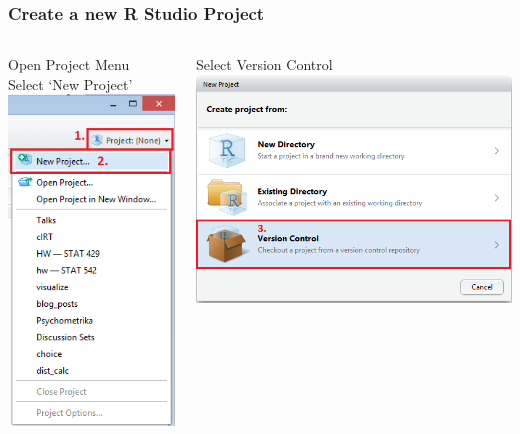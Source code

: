 \documentclass{beamer}\usepackage[]{graphicx}\usepackage[]{color}
\begin{document}
\begin{frame}
\frametitle{Create a new R Studio Project}

\begin{columns}[t]
\centering
\begin{block}{Open Project Menu \\ Select `New Project'}
\centering
\includegraphics[scale=0.32]{img/project/open_menu.png}
\end{block}
\centering
\begin{block}{Select Version Control}
\centering
\includegraphics[scale=0.36]{img/project/select_vc_project.png}
\end{block}
\end{columns}
\end{frame}
\end{document}
